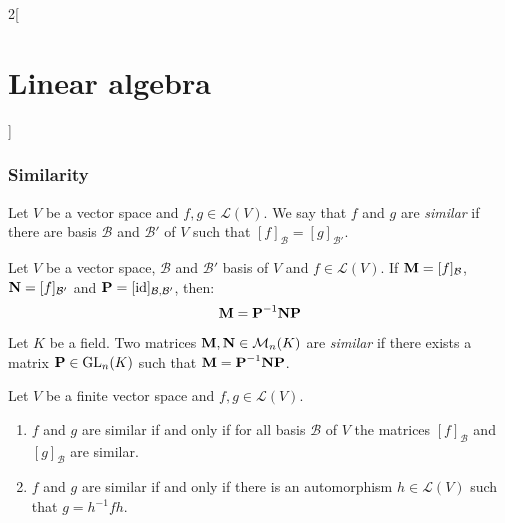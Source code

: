 \documentclass[../../../main.tex]{subfiles}
\begin{document}
\begin{multicols}{2}[\section{Linear algebra}]
  \subsubsection{Similarity}
  \begin{definition}
    Let $V$ be a vector space and $f,g\in\mathcal{L}(V)$. We say that $f$ and $g$ are \emph{similar} if there are basis $\mathcal{B}$ and $\mathcal{B}'$ of $V$ such that $[f]_\mathcal{B}=[g]_{\mathcal{B}'}$.
  \end{definition}
  \begin{lemma}
    Let $V$ be a vector space, $\mathcal{B}$ and $\mathcal{B}'$ basis of $V$ and $f\in\mathcal{L}(V)$. If $\boldsymbol{\mathrm{M}}=[f]_\mathcal{B}$, $\boldsymbol{\mathrm{N}}=[f]_{\mathcal{B}'}$ and $\boldsymbol{\mathrm{P}}=[\mathrm{id}]_{\mathcal{B},\mathcal{B}'}$, then: $$\boldsymbol{\mathrm{M}}=\boldsymbol{\mathrm{P}}^{-1}\boldsymbol{\mathrm{N}}\boldsymbol{\mathrm{P}}$$
  \end{lemma}
  \begin{definition}
    Let $K$ be a field. Two matrices $\boldsymbol{\mathrm{M}}, \boldsymbol{\mathrm{N}}\in\mathcal{M}_n(K)$ are \emph{similar} if there exists a matrix $\boldsymbol{\mathrm{P}}\in\mathrm{GL}_n(K)$ such that $\boldsymbol{\mathrm{M}}=\boldsymbol{\mathrm{P}}^{-1}\boldsymbol{\mathrm{N}}\boldsymbol{\mathrm{P}}$.
  \end{definition}
  \begin{prop}
    Let $V$ be a finite vector space and $f,g\in\mathcal{L}(V)$.
    \begin{enumerate}
      \item $f$ and $g$ are similar if and only if for all basis $\mathcal{B}$ of $V$ the matrices $[f]_\mathcal{B}$ and $[g]_\mathcal{B}$ are similar.
      \item $f$ and $g$ are similar if and only if there is an automorphism $h\in\mathcal{L}(V)$ such that $g=h^{-1}fh$.
    \end{enumerate}
  \end{prop}

\end{multicols}
\end{document}

